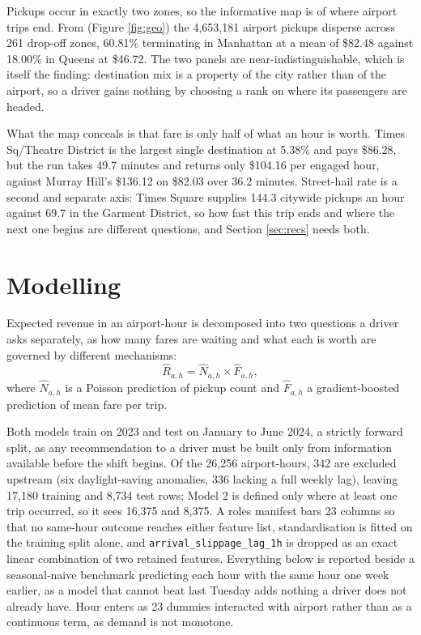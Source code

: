 \documentclass[11pt]{article}
\begin{document}
Pickups occur in exactly two zones, so the informative map is of where airport
trips end. From (Figure \ref{fig:geo}) the 4,653,181 airport pickups disperse
across 261 drop-off zones, 60.81\% terminating in Manhattan at a mean of \$82.48
against 18.00\% in Queens at \$46.72. The two panels are near-indistinguishable,
which is itself the finding: destination mix is a property of the city rather
than of the airport, so a driver gains nothing by choosing a rank on where its
passengers are headed.
 
What the map conceals is that fare is only half of what an hour is worth. Times
Sq/Theatre District is the largest single destination at 5.38\% and pays \$86.28,
but the run takes 49.7 minutes and returns only \$104.16 per engaged hour,
against Murray Hill's \$136.12 on \$82.03 over 36.2 minutes. Street-hail rate is
a second and separate axis: Times Square supplies 144.3 citywide pickups an hour
against 69.7 in the Garment District, so how fast this trip ends and where the
next one begins are different questions, and Section \ref{sec:recs} needs both.
 
\section{Modelling}
\label{sec:modelling}
 
Expected revenue in an airport-hour is decomposed into two questions a driver
asks separately, as how many fares are waiting and what each is worth are
governed by different mechanisms:
\begin{equation}
\widehat{R}_{a,h} = \widehat{N}_{a,h} \times \widehat{F}_{a,h},
\label{eq:product}
\end{equation}
where $\widehat{N}_{a,h}$ is a Poisson prediction of pickup count and
$\widehat{F}_{a,h}$ a gradient-boosted prediction of mean fare per trip.
 
Both models train on 2023 and test on January to June 2024, a strictly forward
split, as any recommendation to a driver must be built only from information
available before the shift begins. Of the 26,256 airport-hours, 342 are excluded
upstream (six daylight-saving anomalies, 336 lacking a full weekly lag), leaving
17,180 training and 8,734 test rows; Model 2 is defined only where at least one
trip occurred, so it sees 16,375 and 8,375. A roles manifest bars 23 columns so
that no same-hour outcome reaches either feature list, standardisation is fitted
on the training split alone, and \texttt{arrival\_slippage\_lag\_1h} is dropped as
an exact linear combination of two retained features. Everything below is
reported beside a seasonal-naive benchmark \cite{hyndman} predicting each hour
with the same hour one week earlier, as a model that cannot beat last Tuesday
adds nothing a driver does not already have. Hour enters as 23 dummies
interacted with airport rather than as a continuous term, as demand is not
monotone.
 
\end{document}
